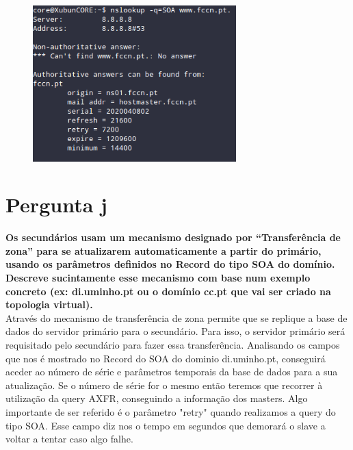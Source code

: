 \documentclass[a4paper]{report}
\begin{document}
\begin{figure}[H]
    \centering 
    \includegraphics[width=0.7\textwidth]{images/fccn_pt.png}  
    \caption{}
    \label{fig:fccn_pt}
\end{figure}

\section{Pergunta j}
\textbf{Os secundários usam um mecanismo designado por “Transferência de zona”
para se atualizarem automaticamente a partir do primário, usando os parâmetros
definidos no Record do tipo SOA do domínio. Descreve sucintamente esse mecanismo
com base num exemplo concreto (ex: di.uminho.pt ou o domínio cc.pt que vai ser
criado na topologia virtual).}\\
Através do mecanismo de transferência de zona permite que se replique a base de 
dados do servidor primário para o secundário. Para isso, o servidor primário
será requisitado pelo secundário para fazer essa transferência. Analisando os 
campos que nos é mostrado no Record do SOA do dominio di.uminho.pt, conseguirá
aceder ao número de série e parâmetros temporais da base de dados para a sua 
atualização. Se o número de série for o mesmo então teremos que recorrer 
à utilização da query AXFR, conseguindo a informação dos masters. Algo importante
de ser referido é o parâmetro "retry" quando realizamos a query do tipo SOA. 
Esse campo diz nos o tempo em segundos que demorará o slave a voltar a tentar 
caso algo falhe.
\end{document}
